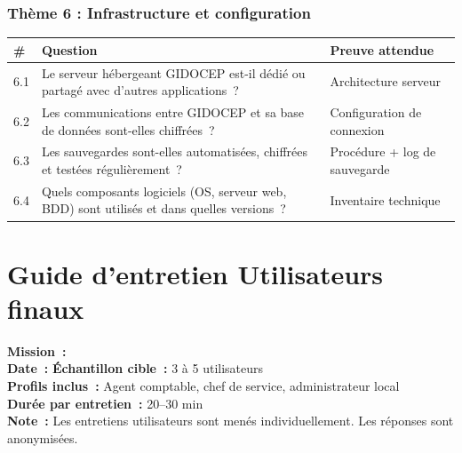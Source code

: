 \documentclass[12pt,a4paper,oneside]{report}
\begin{document}
\subsection*{Th\`eme 6 : Infrastructure et configuration}

\begin{longtable}{|p{0.5cm}|p{8cm}|p{5cm}|}
\hline
\rowcolor{theadcolor}
\color{white}\textbf{\#} &
\color{white}\textbf{Question} &
\color{white}\textbf{Preuve attendue} \\
\hline\endhead\hline\endfoot
\rowcolor{trow1}
6.1 & Le serveur h\'ebergeant GIDOCEP est-il d\'edi\'e ou partag\'e avec d'autres applications~? &
  Architecture serveur \\
\hline\rowcolor{trow2}
6.2 & Les communications entre GIDOCEP et sa base de donn\'ees sont-elles chiffr\'ees~? &
  Configuration de connexion \\
\hline\rowcolor{trow1}
6.3 & Les sauvegardes sont-elles automatis\'ees, chiffr\'ees et test\'ees r\'eguli\`erement~? &
  Proc\'edure + log de sauvegarde \\
\hline\rowcolor{trow2}
6.4 & Quels composants logiciels (OS, serveur web, BDD) sont utilis\'es et dans quelles versions~? &
  Inventaire technique \\
\hline
\end{longtable}

\newpage

\chapter{Guide d'entretien Utilisateurs finaux}
\label{annexe:guide_users}

\begin{goldbox}[title={\color{navy}\bfseries Informations g\'en\'erales}]
\small
\textbf{Mission~:} \dotfill \\[4pt]
\textbf{Date~:} \dotfill \quad \textbf{\'Echantillon cible~:} 3 \`a 5 utilisateurs \\[4pt]
\textbf{Profils inclus~:} Agent comptable, chef de service, administrateur local \\[4pt]
\textbf{Dur\'ee par entretien~:} 20--30 min \\[4pt]
\textbf{Note~:} Les entretiens utilisateurs sont men\'es individuellement. Les r\'eponses sont anonymis\'ees.
\end{goldbox}
\end{document}
